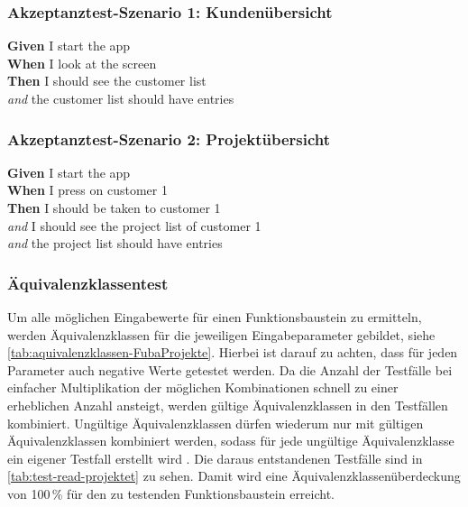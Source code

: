 \subsubsection{Akzeptanztest-Szenario 1: Kundenübersicht}

\textbf{Given} I start the app\\
\textbf{When} I look at the screen\\
\textbf{Then} I should see the customer list\\
\textit{and} the customer list should have entries\\

\subsubsection{Akzeptanztest-Szenario 2: Projektübersicht}

\textbf{Given} I start the app\\
\textbf{When} I press on customer 1\\
\textbf{Then} I should be taken to customer 1\\
\textit{and} I should see the project list of customer 1\\
\textit{and} the project list should have entries\\



\subsubsection{Äquivalenzklassentest}
Um alle möglichen Eingabewerte für einen Funktionsbaustein zu ermitteln, werden Äquivalenzklassen für die jeweiligen Eingabeparameter gebildet, siehe \autoref{tab:aquivalenzklassen-FubaProjekte}. Hierbei ist darauf zu achten, dass für jeden Parameter auch negative Werte getestet werden. Da die Anzahl der Testfälle bei einfacher Multiplikation der möglichen Kombinationen schnell zu einer erheblichen Anzahl ansteigt, werden gültige Äquivalenzklassen in den Testfällen kombiniert. Ungültige Äquivalenzklassen dürfen wiederum nur mit gültigen Äquivalenzklassen kombiniert werden, sodass für jede ungültige Äquivalenzklasse ein eigener Testfall erstellt wird \cite[S.\ 110-115]{Spillner2010}. Die daraus entstandenen Testfälle sind in \autoref{tab:test-read-projektet} zu sehen. Damit wird eine Äquivalenzklassenüberdeckung von 100\,\% für den zu testenden Funktionsbaustein erreicht.

